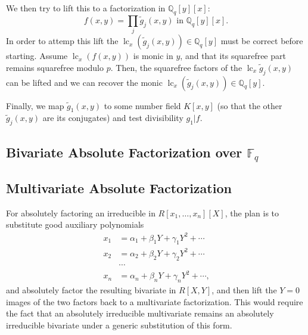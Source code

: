 \documentclass[11pt,reqno]{amsart}
\numberwithin{equation}{section}
\begin{document}
We then try to lift this to a factorization in $\mathbb{Q}_q[y][x]$:
\begin{equation*}
f(x,y) = \prod_j \widetilde{g}_j(x,y) \text{ in } \mathbb{Q}_q[y][x]\text{.}
\end{equation*}
In order to attemp this lift the $\operatorname{lc}_x(\widetilde{g}_j(x,y)) \in \mathbb{Q}_q[y]$ must be correct before starting. Assume $\operatorname{lc}_x(f(x,y))$ is monic in $y$, and that its squarefree part remains squarefree modulo $p$. Then, the squarefree factors of the $\operatorname{lc}_x \widetilde{g}_j(x,y)$ can be lifted and we can recover the monic $\operatorname{lc}_x(\widetilde{g}_j(x,y)) \in \mathbb{Q}_q[y]$.

Finally, we map $\widetilde{g}_1(x,y)$ to some number field $K[x,y]$ (so that the other $\widetilde{g}_j(x,y)$ are its conjugates) and test divisibility $g_1|f$.

\subsection{Bivariate Absolute Factorization over $\mathbb{F}_q$}



\subsection{Multivariate Absolute Factorization}
For absolutely factoring  an irreducible in $R[x_1,\dots,x_n][X]$, the plan is to substitute good auxiliary polynomials
\begin{align*}
x_1 &= \alpha_1 + \beta_1 Y + \gamma_1 Y^2 + \cdots\\
x_2 &= \alpha_2 + \beta_2 Y + \gamma_2 Y^2 + \cdots\\
&\cdots\\
x_n &= \alpha_n + \beta_n Y + \gamma_n Y^2 + \cdots\text{,}
\end{align*}
and absolutely factor the resulting bivariate in $R[X,Y]$, and then lift the $Y=0$ images of the two factors back to a multivariate factorization. This would require the fact that an absolutely irreducible multivariate remains an absolutely irreducible bivariate under a generic substitution of this form.
\end{document}
